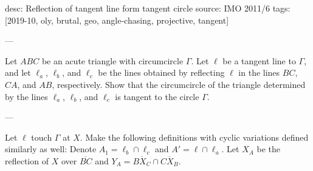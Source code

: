 desc: Reflection of tangent line form tangent circle
source: IMO 2011/6
tags: [2019-10, oly, brutal, geo, angle-chasing, projective, tangent]

---

Let $ABC$ be an acute triangle with circumcircle $\Gamma$. Let $\ell$ be a tangent line to $\Gamma$, and let $\ell_a$, $\ell_b$, and $\ell_c$ be the lines obtained by reflecting $\ell$ in the lines $BC$, $CA$, and $AB$, respectively. Show that the circumcircle of the triangle determined by the lines $\ell_a$, $\ell_b$, and $\ell_c$ is tangent to the circle $\Gamma$.

---

Let $\ell$ touch $\Gamma$ at $X$. Make the following definitions with cyclic variations defined similarly as well: Denote $A_1=\ell_b\cap\ell_c$ and $A'=\ell\cap\ell_a$. Let $X_A$ be the reflection of $X$ over $\overline{BC}$ and $Y_A=\overline{BX_C}\cap\overline{CX_B}$.
